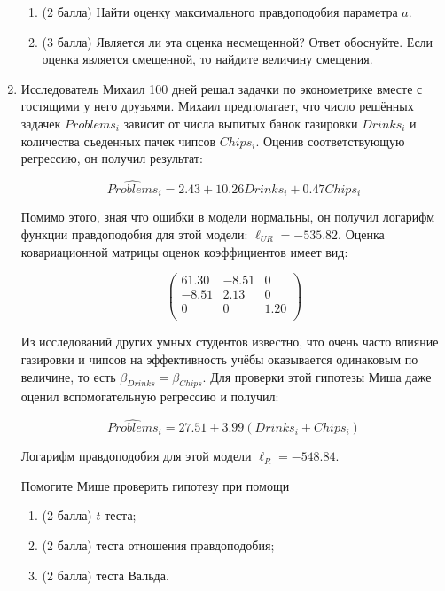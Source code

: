 \begin{enumerate}
    \begin{enumerate}
        \item (2 балла) Найти оценку максимального правдоподобия параметра $a$.
        \item (3 балла) Является ли эта оценка несмещенной? Ответ обоснуйте.
    Если оценка является смещенной, то найдите величину смещения.
    \end{enumerate}
    
    \item Исследователь Михаил 100 дней решал задачки по эконометрике вместе с гостящими у него друзьями. %
    Михаил предполагает, что число решённых задачек $Problems_i$ зависит от числа выпитых банок газировки $Drinks_i$ и количества съеденных пачек чипсов $Chips_i$. 
    Оценив соответствующую регрессию, он получил результат:
    
    \[
        \widehat{Problems}_i = 2.43 + 10.26 Drinks_i + 0.47 Chips_i
    \]
    
    Помимо этого, зная что ошибки в модели нормальны, он получил логарифм функции правдоподобия для этой модели: $\ell_{UR} = -535.82$. 
    Оценка ковариационной матрицы оценок коэффициентов имеет вид: 
    
    \[
        \begin{pmatrix}
        61.30 & -8.51 & 0 \\
        -8.51 & 2.13  & 0 \\
        0     & 0     & 1.20 \\
        \end{pmatrix}
    \]
    
    Из исследований других умных студентов известно, что очень часто влияние газировки и чипсов на эффективность учёбы оказывается одинаковым по величине, то есть $\beta_{Drinks} = \beta_{Chips}$. 
    Для проверки этой гипотезы Миша даже оценил вспомогательную регрессию и получил:
    
    \[
        \widehat{Problems}_i = 27.51 + 3.99 (Drinks_i + Chips_i)
    \]
    
    Логарифм правдоподобия для этой модели $\ell_R = -548.84$.

    Помогите Мише проверить гипотезу при помощи
    
    \begin{enumerate}
        \item (2 балла) $t$-теста; %
        \item (2 балла) теста отношения правдоподобия; %
        \item (2 балла) теста Вальда. %
    \end{enumerate}
    

\end{enumerate}
